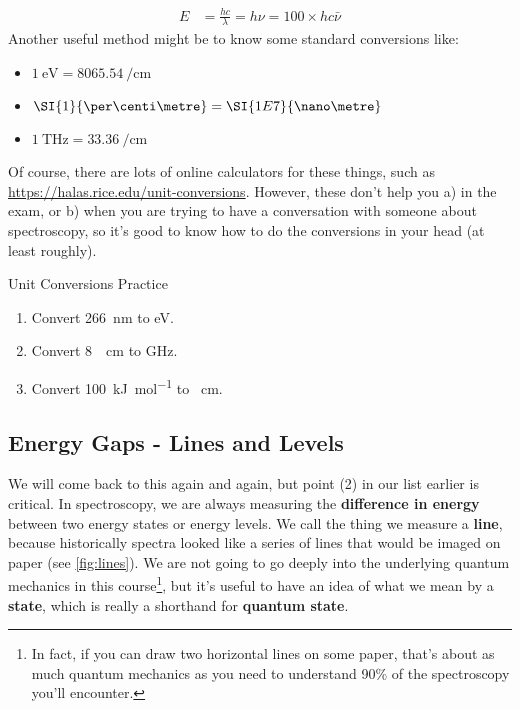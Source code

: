 \begin{align*}
E &= \frac{hc}{\lambda} = h\nu = 100\times hc\bar{\nu} 
\end{align*}
Another useful method might be to know some standard conversions like:
\begin{itemize}
\item $\SI{1}{\electronvolt} = \SI{8065.54}{\per\centi\metre}$
\item $\SI{1}{\per\centi\metre} = \SI{1E7}{\nano\metre}$
\item $\SI{1}{\tera\hertz} = \SI{33.36}{\per\centi\metre}$
\end{itemize}
Of course, there are lots of online calculators for these things, such as \url{https://halas.rice.edu/unit-conversions}. However, these don't help you a) in the exam, or b) when you are trying to have a conversation with someone about spectroscopy, so it's good to know how to do the conversions in your head (at least roughly).

\begin{exercise}{Unit Conversions Practice}
\begin{enumerate}
\item Convert \SI{266}{\nano\metre} to \si{\electronvolt}.
\item Convert \SI{8}{\per\centi\metre} to \si{\giga\hertz}.
\item Convert \SI{100}{\kilo\joule\per\mole} to \si{\per\centi\metre}.
\end{enumerate}
\end{exercise}

\subsection{Energy Gaps - Lines and Levels}
We will come back to this again and again, but point (2) in our list earlier is critical. In spectroscopy, we are always measuring the \textbf{difference in energy} between two energy states or energy levels. We call the thing we measure a \textbf{line}, because historically spectra looked like a series of lines that would be imaged on paper (see \autoref{fig:lines}). We are not going to go deeply into the underlying quantum mechanics in this course\footnote{In fact, if you can draw two horizontal lines on some paper, that's about as much quantum mechanics as you need to understand 90\% of the spectroscopy you'll encounter.}, but it's useful to have an idea of what we mean by a \textbf{state}, which is really a shorthand for \textbf{quantum state}. 

